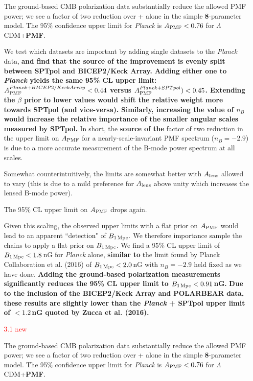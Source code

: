 \documentclass{article}
\newcommand{\apmf}{\ensuremath{A_{\rm PMF}}}
\newcommand{\bpmf}{\ensuremath{B_{\rm 1\,Mpc}}}
\newcommand{\alens}{\ensuremath{A_{\rm lens}}}
\newcommand{\lcdm}{\ensuremath{\Lambda}CDM}
\newcommand{\planck}{{\sl Planck}}
\newcommand{\bicepkeck}{BICEP2/Keck Array}
\newcommand{\sptpol}{SPTpol}
\newcommand{\changed}[1]{\textcolor{Red}{#1}}
\newcommand{\added}[1]{\textbf{#1}}
\newcommand{\diff}[1]{\textcolor{PineGreen}{#1}}
\begin{document}
{\diff{The ground-based CMB polarization data  substantially reduce the allowed PMF power; we see a factor of two reduction over \plan+{} alone in the simple \added{8}-parameter model. 
The 95\% confidence upper limit for \planck{} is $\apmf <  \upperAplk$ for \lcdm{}+\added{PMF}. }

\diff{We test which datasets are important by adding single datasets to the \planck{} data, \added{and find that the source of the improvement is evenly split between \sptpol{} and \bicepkeck{}.
	Adding either one to \planck{} yields the same 95\% CL upper limit: $\apmf^{\planck+\bicepkeck} <  \upperAbicep$ versus  $\apmf^{\planck+\sptpol}) < \upperAsptpol$. 
	Extending the $\beta$ prior to lower values would shift the relative weight more towards \sptpol{} (and vice-versa). 
	Similarly, increasing the value of $n_B$ would  increase the relative importance of the smaller angular scales measured by \sptpol.}
In short, the \added{source of the} factor of two reduction in the upper limit on \apmf{} for a nearly-scale-invariant PMF spectrum ($n_B=-2.9$) is due to a more accurate measurement of the B-mode power spectrum at all scales.}

\diff{Somewhat counterintuitively, the limits are somewhat better with \alens{} allowed to vary (this is due to a mild preference for \alens{} above unity which increases the lensed B-mode power). }

\diff{The 95\% CL upper limit on \apmf{} drops again.}

\diff{Given this scaling, the observed upper limits with a flat prior on \apmf{} would lead to an apparent ``detection" of \bpmf. 
We therefore importance sample the chains to apply a flat prior on \bpmf. 
We find a 95\% CL upper limit of $\bpmf < \upperBplk$\,nG for \planck{} alone,
\added{similar to} the limit found by Planck Collaboration et al. (2016) of $\bpmf < 2.0$\,nG with $n_B=-2.9$ held fixed as we have done. 
\added{Adding the ground-based polarization measurements significantly reduces the 95\% CL upper limit to $\bpmf < \upperBall$\,nG. }
\added{Due to the inclusion of the \bicepkeck{} and POLARBEAR data, these results are slightly lower than the \planck{} + \sptpol{} upper limit of $<1.2\,$nG quoted by Zucca et al. (2016).}}

\iffalse
\changed{3.1 new} 

The ground-based CMB polarization data  substantially reduce the allowed PMF power; we see a factor of two reduction over \plan+{} alone in the simple \added{8}-parameter model. 
The 95\% confidence upper limit for \planck{} is $\apmf <  \upperAplk$ for \lcdm{}+\added{PMF}. 

}
\end{document}
